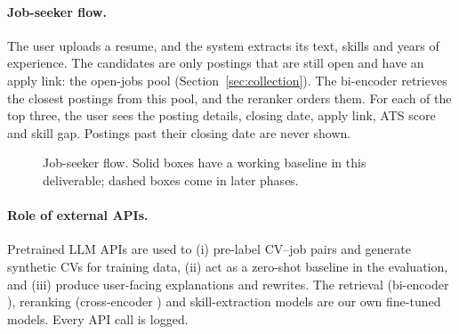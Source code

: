 \documentclass[11pt,a4paper]{article}
\begin{document}
\paragraph{Job-seeker flow.} The user uploads a resume, and the system extracts its text,
skills and years of experience. The candidates are only postings that are still open and have
an apply link: the open-jobs pool (Section~\ref{sec:collection}). The bi-encoder retrieves the
closest postings from this pool, and the reranker orders them. For each of the top three, the
user sees the posting details, closing date, apply link, ATS score and skill gap. Postings past
their closing date are never shown.

\begin{figure}[H]
\centering
{}
\caption{Job-seeker flow. Solid boxes have a working baseline in this deliverable; dashed boxes
come in later phases.}
\end{figure}

\paragraph{Role of external APIs.} Pretrained LLM APIs are used to (i) pre-label CV--job pairs
and generate synthetic CVs for training data, (ii) act as a zero-shot baseline in the
evaluation, and (iii) produce user-facing explanations and rewrites. The retrieval (bi-encoder
\cite{sbert}), reranking (cross-encoder \cite{monobert}) and skill-extraction models are our own
fine-tuned models. Every API call is logged.
\end{document}
